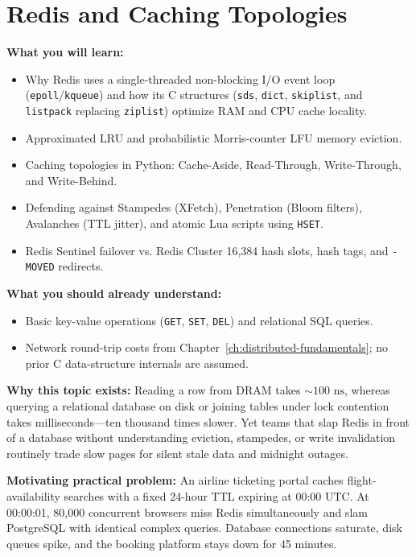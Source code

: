 \chapter{Redis and Caching Topologies}
\label{ch:redis-caching}

\begin{chaptergoalsbox}
\textbf{What you will learn:}
\begin{itemize}[leftmargin=12pt]
  \item Why Redis uses a single-threaded non-blocking I/O event loop (\texttt{epoll}/\texttt{kqueue}) and how its C structures (\texttt{sds}, \texttt{dict}, \texttt{skiplist}, and \texttt{listpack} replacing \texttt{ziplist}) optimize RAM and CPU cache locality.
  \item Approximated LRU and probabilistic Morris-counter LFU memory eviction.
  \item Caching topologies in Python: Cache-Aside, Read-Through, Write-Through, and Write-Behind.
  \item Defending against Stampedes (XFetch), Penetration (Bloom filters), Avalanches (TTL jitter), and atomic Lua scripts using \texttt{HSET}.
  \item Redis Sentinel failover vs. Redis Cluster 16,384 hash slots, hash tags, and \texttt{-MOVED} redirects.
\end{itemize}

\textbf{What you should already understand:}
\begin{itemize}[leftmargin=12pt]
  \item Basic key-value operations (\texttt{GET}, \texttt{SET}, \texttt{DEL}) and relational SQL queries.
  \item Network round-trip costs from Chapter~\ref{ch:distributed-fundamentals}; no prior C data-structure internals are assumed.
\end{itemize}

\textbf{Why this topic exists:}
Reading a row from DRAM takes $\sim 100\text{ ns}$, whereas querying a relational database on disk or joining tables under lock contention takes milliseconds---ten thousand times slower. Yet teams that slap Redis in front of a database without understanding eviction, stampedes, or write invalidation routinely trade slow pages for silent stale data and midnight outages.

\textbf{Motivating practical problem:}
An airline ticketing portal caches flight-availability searches with a fixed 24-hour TTL expiring at 00:00 UTC. At 00:00:01, 80,000 concurrent browsers miss Redis simultaneously and slam PostgreSQL with identical complex queries. Database connections saturate, disk queues spike, and the booking platform stays down for 45 minutes.
\end{chaptergoalsbox}

